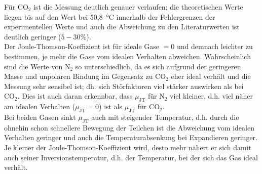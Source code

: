 \documentclass[a4paper,12pt,oneside,onecolum,final,openany]{report}
\begin{document}
Für $\mathrm{CO}_2$ ist die Messung deutlich genauer verlaufen; die theoretischen Werte liegen bis auf den Wert bei 50,8~°C innerhalb der Fehlergrenzen der experimentellen Werte und auch die Abweichung zu den Literaturwerten ist deutlich geringer ($5-30\%$).\\

Der Joule-Thomson-Koeffizient ist für ideale Gase $=0$ und demnach leichter zu bestimmen, je mehr die Gase vom idealen Verhalten abweichen. Wahrscheinlich sind die Werte von $\mathrm{N}_2$ so unterschiedlich, da es sich aufgrund der geringeren Masse und unpolaren Bindung im Gegensatz zu $\mathrm{CO}_2$ eher ideal verhält und die Messung sehr sensibel ist; dh. sich Störfaktoren viel stärker auswirken als bei $\mathrm{CO}_2$. Dies ist auch daran erkennbar, dass $\mu_\mathrm{JT}$ für $\mathrm{N}_2$ viel kleiner, d.h. viel näher am idealen Verhalten ($\mu_\mathrm{JT} =0$)  ist als $\mu_\mathrm{JT}$ für $\mathrm{CO}_2$.\\
Bei beiden Gasen sinkt $\mu_\mathrm{JT}$ auch mit steigender Temperatur, d.h. durch die ohnehin schon schnellere Bewegung der Teilchen ist die Abweichung vom idealen Verhalten geringer und auch die Temperaturabsenkung bei Expandieren geringer. Je kleiner der Joule-Thomson-Koeffizient wird, desto mehr nähert er sich damit auch seiner Inversionstemperatur, d.h. der Temperatur, bei der sich das Gas ideal verhält.\\
 
 
 
\end{document}
